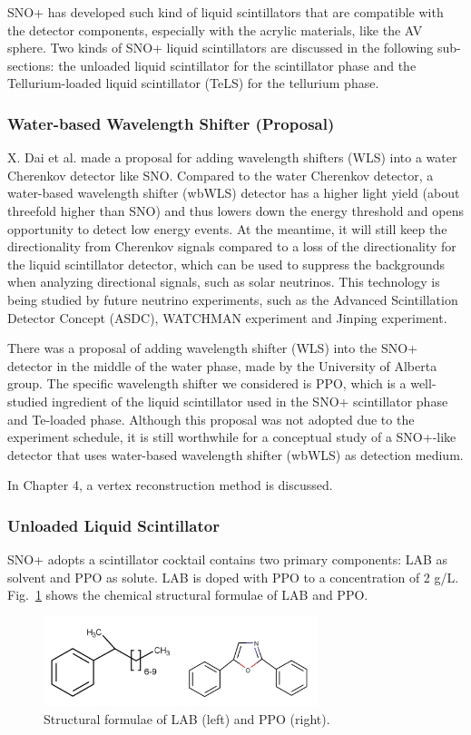 SNO+ has developed such kind of liquid scintillators that are compatible with the detector components, especially with the acrylic materials, like the AV sphere. Two kinds of SNO+ liquid scintillators are discussed in the following sub-sections: the unloaded liquid scintillator for the scintillator phase and the Tellurium-loaded liquid scintillator (TeLS) for the tellurium phase.

\subsubsection{Water-based Wavelength Shifter (Proposal)}\label{sect:wbWLS}
X. Dai et al.\cite{dai2008wavelength} made a proposal for adding wavelength shifters (WLS) into a water Cherenkov detector like SNO. Compared to the water Cherenkov detector, a water-based wavelength shifter (wbWLS) detector has a higher light yield (about threefold higher than SNO\cite{dai2008wavelength}) and thus lowers down the energy threshold and opens opportunity to detect low energy events. At the meantime, it will still keep the directionality from Cherenkov signals compared to a loss of the directionality for the liquid scintillator detector, which can be used to suppress the backgrounds when analyzing directional signals, such as solar neutrinos. This technology is being studied by future neutrino experiments, such as the Advanced Scintillation Detector Concept (ASDC)\cite{alonso2014advanced}, WATCHMAN experiment\cite{askins2015physics} and Jinping experiment\cite{beacom2017physics}.

There was a proposal of adding wavelength shifter (WLS) into the SNO+ detector in the middle of the water phase, made by the University of Alberta group. The specific wavelength shifter we considered is PPO, which is a well-studied ingredient of the liquid scintillator used in the SNO+ scintillator phase and Te-loaded phase. Although this proposal was not adopted due to the experiment schedule, it is still worthwhile for a conceptual study of a SNO+-like detector that uses water-based wavelength shifter (wbWLS) as detection medium.

In Chapter 4, a vertex reconstruction method is discussed. 

\subsubsection{Unloaded Liquid Scintillator}\label{sect:LS_SNO+}
SNO+ adopts a scintillator cocktail contains two primary components: LAB as solvent and PPO as solute. LAB is doped with PPO to a concentration of 2 g/L. Fig.~\ref{labppo-molecule} shows the chemical structural formulae of LAB and PPO\cite{collaboration2020development}.
\begin{figure}[!htb]
	\centering
	\includegraphics[width=8cm]{lab-ppo-molecule.png}
	\caption{Structural formulae of LAB (left) and PPO (right).}
	\label{labppo-molecule}
\end{figure}

